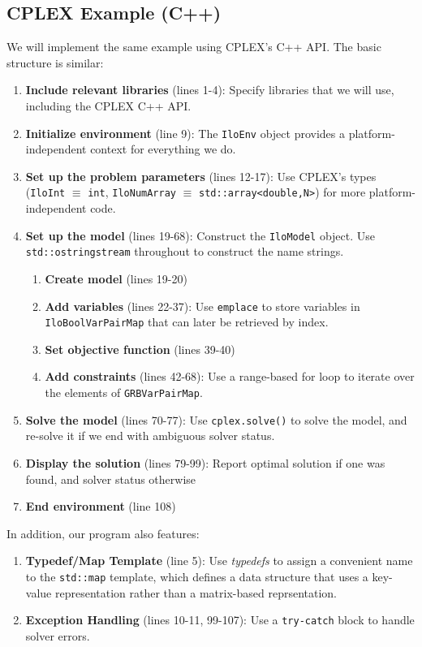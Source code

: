 \documentclass[12pt]{article}
\begin{document}
\subsection{CPLEX Example (C++)}
We will implement the same example using CPLEX's C++ API. The basic structure is similar:
\begin{enumerate}
    \item \textbf{Include relevant libraries} (lines 1-4): Specify libraries that we will use, including the CPLEX C++ API.
    \item \textbf{Initialize environment} (line 9): The \texttt{IloEnv} object provides a platform-independent context for everything we do.
    \item \textbf{Set up the problem parameters} (lines 12-17): Use CPLEX's types (\texttt{IloInt} $\equiv$ \texttt{int}, \texttt{IloNumArray} $\equiv$ \texttt{std::array<double,N>}) for more platform-independent code.
    \item \textbf{Set up the model} (lines 19-68): Construct the \texttt{IloModel} object. Use \texttt{std::ostringstream} throughout to construct the name strings.
        \begin{enumerate}
            \item \textbf{Create model} (lines 19-20)
            \item \textbf{Add variables} (lines 22-37): Use \texttt{emplace} to store variables in \texttt{IloBoolVarPairMap} that can later be retrieved by index.
            \item \textbf{Set objective function} (lines 39-40)
            \item \textbf{Add constraints} (lines 42-68): Use a range-based for loop to iterate over the elements of \texttt{GRBVarPairMap}.
        \end{enumerate}
    \item \textbf{Solve the model} (lines 70-77): Use \texttt{cplex.solve()} to solve the model, and re-solve it if we end with ambiguous solver status.
    \item \textbf{Display the solution} (lines 79-99): Report optimal solution if one was found, and solver status otherwise
    \item \textbf{End environment} (line 108)
\end{enumerate}
In addition, our program also features:
\begin{enumerate}
    \item \textbf{Typedef/Map Template} (line 5): Use \emph{typedefs} to assign a convenient name to the \texttt{std::map} template, which defines a data structure that uses a key-value representation rather than a matrix-based reprsentation.
    \item \textbf{Exception Handling} (lines 10-11, 99-107): Use a \texttt{try-catch} block to handle solver errors.
\end{enumerate}
\end{document}
